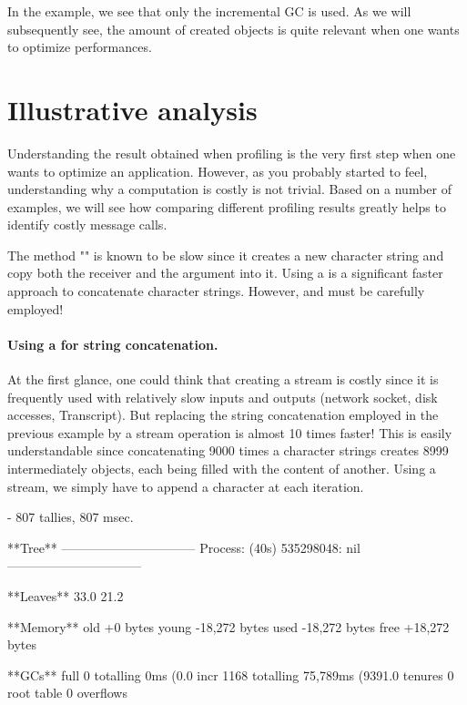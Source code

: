 \documentclass[a4paper,10pt,twoside]{book}
\begin{document}
In the example, we see that only the incremental GC is used. As we will subsequently see, the amount of created objects is quite relevant when one wants to optimize performances.

\section{Illustrative analysis}

Understanding the result obtained when profiling is the very first step when one wants to optimize an application. However, as you probably started to feel, understanding why a computation is costly is not trivial. Based on a number of examples, we will see how comparing different profiling results greatly helps to identify costly message calls. 

The method "\ct{,}" is known to be slow since it creates a new character string and copy both the receiver and the argument into it. Using a  is a significant faster approach to concatenate character strings. However,  and  must be carefully employed!


\paragraph{Using a  for string concatenation.}
At the first glance, one could think that creating a stream is costly since it is frequently used with relatively slow inputs and outputs (\eg network socket, disk accesses, Transcript). But replacing the string concatenation employed in the previous example by a stream operation is almost 10 times faster! This is easily understandable since concatenating 9000 times a character strings creates 8999 intermediately objects, each being filled with the content of another. Using a stream, we simply have to append a character at each iteration.


\begin{code}{}

 - 807 tallies, 807 msec.

**Tree**
--------------------------------
Process: (40s)  535298048: nil
--------------------------------

**Leaves**
33.0%
21.2%

**Memory**
	old			+0 bytes
	young		-18,272 bytes
	used		-18,272 bytes
	free		+18,272 bytes

**GCs**
	full			0 totalling 0ms (0.0%
	incr		1168 totalling 75,789ms (9391.0%
	tenures		0
	root table	0 overflows
\end{code}
\end{document}
